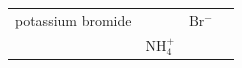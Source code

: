 \begin{enumerate}[noitemsep, label=\textbf{\arabic*}. ]
{\begin{tabular}[t]{|l|l|l|l|}
    
     \tabularnewline\cline{1-1}\cline{2-2}\cline{3-3}\cline{4-4}
    
    
        potassium bromide &
    
    
         &
    
    
        \begin{math}\mathrm{Br}{}^{-}\end{math} &
    
    
     \tabularnewline\cline{1-1}\cline{2-2}\cline{3-3}\cline{4-4}
    
    
         &
    
    
        \begin{math}\mathrm{NH}_{4}^{+}\end{math} &
    
    

\end{tabular}}
\end{enumerate}
